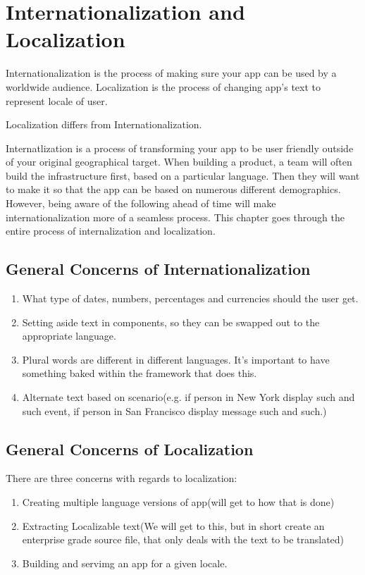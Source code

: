 \chapter{ Internationalization and Localization}
Internationalization is the process of making sure your app can be used by a worldwide audience. Localization is the process of changing app's text to represent locale of user.

Localization differs from Internationalization. 

Internatlization is a process of transforming your app to be user friendly outside of your original geographical target. When building a product, a team will often build the infrastructure first, based on a particular language. Then they will want to make it so that the app can be based on numerous different demographics. However, being aware of the following ahead of time will make internationalization more of a seamless process. This chapter goes through the entire process of internalization and localization.

\section{General Concerns of Internationalization }

\begin{enumerate}
  \item What type of dates, numbers, percentages and currencies should the user get.
  \item Setting aside text in components, so they can be swapped out to the appropriate language. 
  \item Plural words are different in different languages. It's important to have something baked within the framework that does this. 
  \item Alternate text based on scenario(e.g. if person in New York display such and such event, if person in San Francisco display message such and such.)
\end{enumerate}

\section{General Concerns of Localization }
There are three concerns with regards to localization: 
\begin{enumerate}
  \item Creating multiple language versions of app(will get to how that is done)
  \item Extracting Localizable text(We will get to this, but in short create an enterprise grade source file, that only deals with the text to be translated)
  \item Building and servimg an app for a given locale. 
\end{enumerate}

